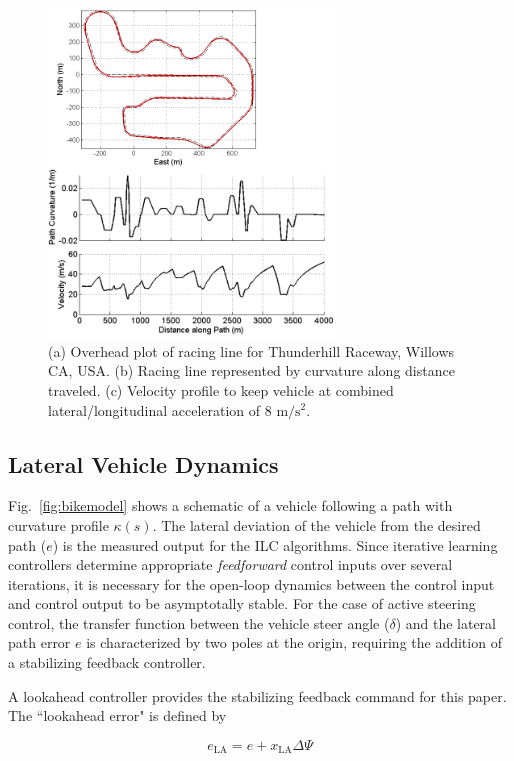 \documentclass[letterpaper, 10 pt, conference]{ieeeconf}  %
\begin{document}
\begin{figure}[h]
\centering
\includegraphics[width=3in]{figures/problemInfo.png}
\caption{(a) Overhead plot of racing line for Thunderhill Raceway, Willows CA, USA. (b) Racing line represented by curvature along distance traveled. (c) Velocity profile
to keep vehicle at combined lateral/longitudinal acceleration of 8 $\mathrm{m/s^2}$.}
\label{problemInfo}
\end{figure}

\subsection{Lateral Vehicle Dynamics}

Fig.~\ref{fig:bikemodel} shows a schematic of a vehicle following a path
with curvature profile $\kappa(s)$. The lateral deviation of the vehicle from the desired path ($e$) is the measured output for the ILC algorithms.
Since iterative learning controllers determine appropriate \textit{feedforward} control inputs over several iterations, it is necessary for the open-loop dynamics between the control input and
control output to be asymptotally stable. For the case of active steering control, the transfer function between the vehicle steer angle ($\delta$) and the lateral path error $e$ is
characterized by two poles at the origin, requiring the addition of a stabilizing feedback controller.

A lookahead controller provides the stabilizing feedback command for this paper. The ``lookahead error" is defined by 

\begin{equation}
	e_\mathrm{LA}=e+x_\mathrm{LA}\Delta\Psi
\end{equation}
\end{document}
